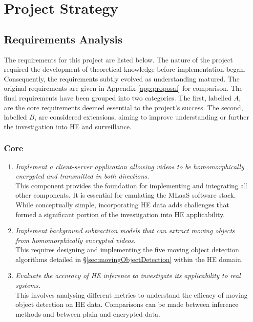 \setlength{\leftskip}{0cm}





\section{Project Strategy}
\label{sec:projectStrategy}

\subsection{Requirements Analysis}
\label{sec:requirements}
\setlength{\leftskip}{0.5cm}
\indent \indent
The requirements for this project are listed below. The nature of the project required the development of theoretical knowledge before implementation began. Consequently, the requirements subtly evolved as understanding matured. The original requirements are given in Appendix \ref{app:proposal} for comparison. The final requirements have been grouped into two categories. The first, labelled $A$, are the core requirements deemed essential to the project's success. The second, labelled $B$, are considered extensions, aiming to improve understanding or further the investigation into HE and surveillance.
\subsubsection{Core}
\begin{enumerate}[leftmargin=1.75cm,label=\texttt{A\arabic*:}]
    \item \textit{Implement a client-server application allowing videos to be homomorphically encrypted and transmitted in both directions.} \smallskip \\ This component provides the foundation for implementing and integrating all other components. It is essential for emulating the MLaaS software stack. While conceptually simple, incorporating HE data adds challenges that formed a significant portion of the investigation into HE applicability.
    \item \textit{Implement background subtraction models that can extract moving objects from homomorphically encrypted videos.} \smallskip \\ This requires designing and implementing the five moving object detection algorithms detailed in §\ref{sec:movingObjectDetection} within the HE domain.
    \item \textit{Evaluate the accuracy of HE inference to investigate its applicability to real systems.} \smallskip \\ This involves analysing different metrics to understand the efficacy of moving object detection on HE data. Comparisons can be made between inference methods and between plain and encrypted data.
\end{enumerate}
